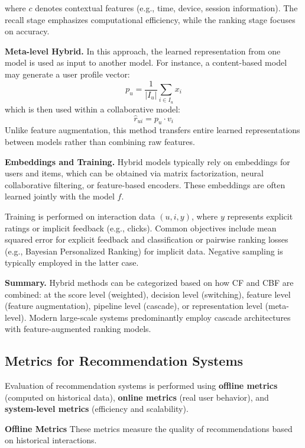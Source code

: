 \documentclass[10pt,a4paper]{article}
\begin{document}
	where $c$ denotes contextual features (e.g., time, device, session information). The recall stage emphasizes computational efficiency, while the ranking stage focuses on accuracy.
	
	\textbf{Meta-level Hybrid.} 
	In this approach, the learned representation from one model is used as input to another model. For instance, a content-based model may generate a user profile vector:
	\[
	p_u = \frac{1}{|I_u|} \sum_{i \in I_u} x_i
	\]
	which is then used within a collaborative model:
	\[
	\hat{r}_{ui} = p_u \cdot v_i
	\]
	Unlike feature augmentation, this method transfers entire learned representations between models rather than combining raw features.
	
	\textbf{Embeddings and Training.} 
	Hybrid models typically rely on embeddings for users and items, which can be obtained via matrix factorization, neural collaborative filtering, or feature-based encoders. These embeddings are often learned jointly with the model $f$.
	
	Training is performed on interaction data $(u,i,y)$, where $y$ represents explicit ratings or implicit feedback (e.g., clicks). Common objectives include mean squared error for explicit feedback and classification or pairwise ranking losses (e.g., Bayesian Personalized Ranking) for implicit data. Negative sampling is typically employed in the latter case.
	
	\textbf{Summary.} 
	Hybrid methods can be categorized based on how CF and CBF are combined: at the score level (weighted), decision level (switching), feature level (feature augmentation), pipeline level (cascade), or representation level (meta-level). Modern large-scale systems predominantly employ cascade architectures with feature-augmented ranking models.



	\subsection{Metrics for Recommendation Systems}
	
	Evaluation of recommendation systems is performed using \textbf{offline metrics} (computed on historical data), \textbf{online metrics} (real user behavior), and \textbf{system-level metrics} (efficiency and scalability).  
	
	\textbf{Offline Metrics}  
	These metrics measure the quality of recommendations based on historical interactions.
	
\end{document}
